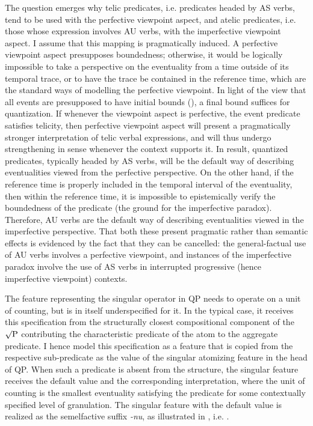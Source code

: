 \documentclass[output=paper]{langscibook}
\begin{document}
The question emerges why telic predicates, i.e. predicates headed by AS verbs, tend to be used with the perfective viewpoint aspect, and atelic predicates, i.e. those whose expression involves AU verbs, with the imperfective viewpoint aspect. I assume that this mapping is pragmatically induced. A perfective viewpoint aspect presupposes boundedness; otherwise, it would be logically impossible to take a perspective on the eventuality from a time outside of its temporal trace, or to have the trace be contained in the reference time, which are the standard ways of modelling the perfective viewpoint. In light of the view that all events are presupposed to have initial bounds (\citealt{Arsenij.2006}), a final bound suffices for quantization. If whenever the viewpoint aspect is perfective, the event predicate satisfies telicity, then perfective viewpoint aspect will present a pragmatically stronger interpretation of telic verbal expressions, and will thus undergo strengthening in  sense whenever the context supports it. In result, quantized predicates, typically headed by AS verbs, will be the default way of describing eventualities viewed from the perfective perspective. On the other hand, if the reference time is properly included in the temporal interval of the eventuality, then within the reference time, it is impossible to epistemically verify the boundedness of the predicate (the ground for the imperfective paradox). Therefore, AU verbs are the default way of describing eventualities viewed in the imperfective perspective. That both these present pragmatic rather than semantic effects is evidenced by the fact that they can be cancelled: the general-factual use of AU verbs involves a perfective viewpoint, and instances of the imperfective paradox involve the use of AS verbs in interrupted progressive (hence imperfective viewpoint) contexts.

The feature representing the singular operator in QP needs to operate on a unit of counting, but is in itself underspecified for it. In the typical case, it receives this specification from the structurally closest compositional component of the $\surd\text{P}$ contributing the characteristic predicate of the atom to the aggregate predicate. I hence model this specification as a feature that is copied from the respective sub-predicate as the value of the singular atomizing feature in the head of QP. When such a predicate is absent from the structure, the singular feature receives the default value and the corresponding interpretation, where the unit of counting is the smallest eventuality satisfying the predicate for some contextually specified level of granulation. The singular feature with the default value is realized as the semelfactive suffix \textit{-nu}, as illustrated in , i.e. . 
\end{document}
